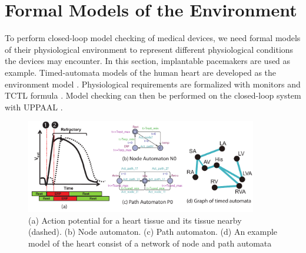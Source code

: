 \section{Formal Models of the Environment}
\label{formalModelsofEnv}
To perform closed-loop model checking of medical devices, we need formal models of their physiological environment to represent different physiological conditions the devices may encounter. In this section, implantable pacemakers are used as example. Timed-automata \cite{timed_automata} models of the human heart are developed as the environment model \cite{sttt13,VHM_proc}. Physiological requirements are formalized with monitors and TCTL formula  \cite{TCTL}. 
Model checking can then be performed on the closed-loop system with UPPAAL \cite{uppaal}. %
\begin{figure}[!t]
	\centering
	\includegraphics[width=0.9\textwidth]{figs/init_abs.pdf}
	\caption{\small (a) Action potential for a heart tissue and its tissue nearby (dashed). (b) Node automaton. (c) Path automaton. (d) An example model of the heart consist of a network of node and path automata}
	\label{fig:nodepathTA}
\end{figure}

